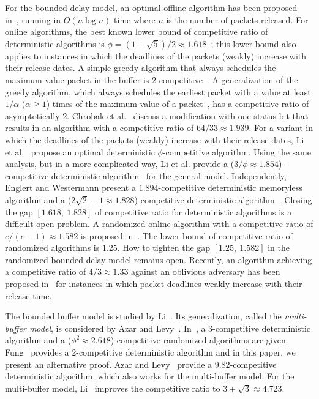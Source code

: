 \documentclass[final, 11pt]{article}
\begin{document}
For the bounded-delay model, an optimal offline algorithm has been proposed in~\cite{KLMPSS04}, running in $O(n \log n)$ time where $n$ is the number of packets released. For online algorithms, the best known lower bound of competitive ratio of deterministic algorithms is $\phi = (1 + \sqrt{5}) / 2 \approx 1.618$~\cite{H01, CF03, AMZ03}; this lower-bound also applies to instances in which the deadlines of the packets (weakly) increase with their release dates. A simple greedy algorithm that always schedules the maximum-value packet in the buffer is $2$-competitive~\cite{H01, KLMPSS04}.  A generalization of the greedy algorithm, which always schedules the earliest packet with a value at least $1 / \alpha$ ($\alpha \ge 1$) times of the maximum-value of a packet~\cite{CCFJST06}, has a competitive ratio of asymptotically $2$.  Chrobak et al.~\cite{CJST07} discuss a modification with one status bit that results in an algorithm with a competitive ratio of $64 / 33 \approx 1.939$. For a variant in which the deadlines of the packets (weakly) increase with their release dates, Li et al.~\cite{LSS05} propose an optimal deterministic $\phi$-competitive algorithm. Using the same analysis, but in a more complicated way, Li et al. provide a ($3 / \phi \approx 1.854$)-competitive deterministic algorithm~\cite{LSS05} for the general model. Independently, Englert and Westermann present a $1.894$-competitive deterministic memoryless algorithm and a ($2 \sqrt{2} - 1 \approx 1.828$)-competitive deterministic algorithm~\cite{EW07}. Closing the gap $[1.618, \ 1.828]$ of competitive ratio for deterministic algorithms is a difficult open problem. A randomized online algorithm with a competitive ratio of $e / (e - 1) \approx 1.582$ is proposed in~\cite{CCFJST06}. The lower bound of competitive ratio of randomized algorithms is $1.25$. How to tighten the gap $[1.25, \ 1.582]$ in the randomized bounded-delay model remains open. Recently, an algorithm achieving a competitive ratio of $4 / 3 \approx 1.33$ against an oblivious adversary has been proposed in~\cite{JLSS09} for instances in which packet deadlines weakly increase with their release time.

The bounded buffer model is studied by Li~\cite{L09}. Its generalization, called the {\em multi-buffer model}, is considered by Azar and Levy~\cite{AL06}. In~\cite{L09}, a $3$-competitive deterministic algorithm and a ($\phi^2 \approx 2.618$)-competitive randomized algorithms are given. Fung~\cite{F09} provides a $2$-competitive deterministic algorithm and in this paper, we present an alternative proof. Azar and Levy~\cite{AL06} provide a $9.82$-competitive deterministic algorithm, which also works for the multi-buffer model. For the multi-buffer model, Li~\cite{L09b} improves the competitive ratio to $3 + \sqrt{3} \approx 4.723$.
\end{document}
